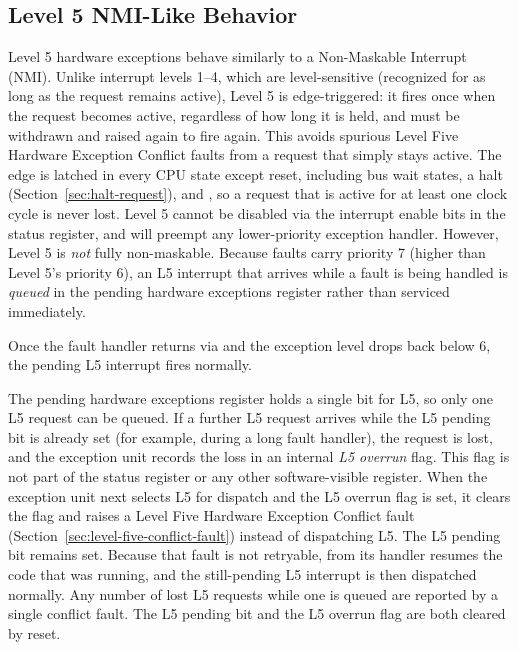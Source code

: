 \subsection{Level 5 NMI-Like Behavior}
\label{sec:level-5-nmi-behavior}

Level 5 hardware exceptions behave similarly to a Non-Maskable Interrupt (NMI). Unlike interrupt levels 1--4, which are
level-sensitive (recognized for as long as the request remains active), Level 5 is edge-triggered: it fires once when
the request becomes active, regardless of how long it is held, and must be withdrawn and raised again to fire again.
This avoids spurious Level Five Hardware Exception Conflict faults from a request that simply stays active. The edge is
latched in every CPU state except reset, including bus wait states, a halt (Section~\ref{sec:halt-request}), and
, so a request that is active for at least one clock cycle is never lost. Level 5 cannot be disabled via
the interrupt enable bits in the status register, and will preempt any lower-priority exception handler. However, Level
5 is \textit{not} fully non-maskable. Because faults carry priority 7 (higher than Level 5's priority 6), an L5
interrupt that arrives while a fault is being handled is \textit{queued} in the pending hardware exceptions register
rather than serviced immediately.

Once the fault handler returns via  and the exception level drops back below 6, the pending L5 interrupt
fires normally.

The pending hardware exceptions register holds a single bit for L5, so only one L5 request can be queued. If a further
L5 request arrives while the L5 pending bit is already set (for example, during a long fault handler), the request is
lost, and the exception unit records the loss in an internal \emph{L5 overrun} flag. This flag is not part of the
status register or any other software-visible register. When the exception unit next selects L5 for dispatch and the L5
overrun flag is set, it clears the flag and raises a Level Five Hardware Exception Conflict fault
(Section~\ref{sec:level-five-conflict-fault}) instead of dispatching L5. The L5 pending bit remains set. Because that
fault is not retryable,  from its handler resumes the code that was running, and the still-pending L5
interrupt is then dispatched normally. Any number of lost L5 requests while one is queued are reported by a single
conflict fault. The L5 pending bit and the L5 overrun flag are both cleared by reset.

